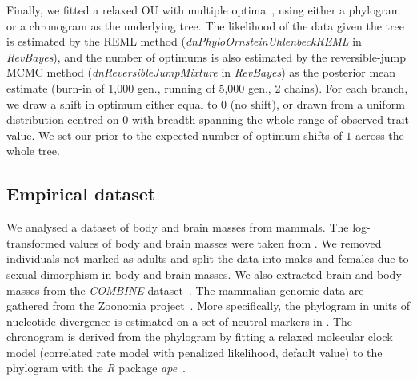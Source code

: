\documentclass{article}
\begin{document}
Finally, we fitted a relaxed OU with multiple optima~\citep{uyeda_novel_2014}, using either a phylogram or a chronogram as the underlying tree.
The likelihood of the data given the tree is estimated by the REML method (\textit{dnPhyloOrnsteinUhlenbeckREML} in \textit{RevBayes}), and the number of optimums is also estimated by the reversible-jump MCMC method (\textit{dnReversibleJumpMixture} in \textit{RevBayes}) as the posterior mean estimate (burn-in of 1,000 gen., running of 5,000 gen., 2 chains).
For each branch, we draw a shift in optimum either equal to $0$ (no shift), or drawn from a uniform distribution centred on $0$ with breadth spanning the whole range of observed trait value.
We set our prior to the expected number of optimum shifts of $1$ across the whole tree.

\subsection*{Empirical dataset}
We analysed a dataset of body and brain masses from mammals.
The log-transformed values of body and brain masses were taken from \citet{tsuboi_breakdown_2018}.
We removed individuals not marked as adults and split the data into males and females due to sexual dimorphism in body and brain masses.
We also extracted brain and body masses from the \textit{COMBINE} dataset~\citep{soria_combine_2021}.
The mammalian genomic data are gathered from the Zoonomia project~\citep{genereux_comparative_2020}.
More specifically, the phylogram in units of nucleotide divergence is estimated on a set of neutral markers in \citet{foley_genomic_2023}.
The chronogram is derived from the phylogram by fitting a relaxed molecular clock model (correlated rate model with penalized likelihood, default value) to the phylogram with the \textit{R} package \textit{ape}~\citep{paradis_ape_2004}.
\end{document}

